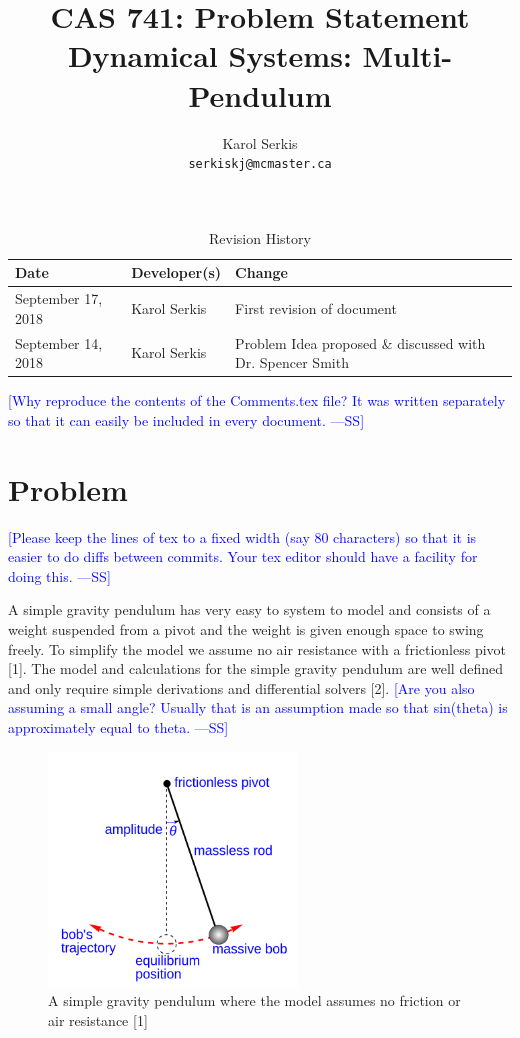 \documentclass{article}
\title{CAS 741: Problem Statement\\[10pt]\Large Dynamical Systems: Multi-Pendulum }
\author{Karol Serkis\\\texttt{serkiskj@mcmaster.ca}}
\date{}
\newcommand{\authornote}[3]{\textcolor{#1}{[#3 ---#2]}}
\newcommand{\authornote}[3]{}
\newcommand{\wss}[1]{\authornote{blue}{SS}{#1}}
\begin{document}

\maketitle

\begin{table}[hp]
\caption{Revision History} \label{TblRevisionHistory}
\begin{tabularx}{\textwidth}{llX}
\toprule
\textbf{Date} & \textbf{Developer(s)} & \textbf{Change}\\
\midrule
September 17, 2018 & Karol Serkis & First revision of document\\

September 14, 2018 & Karol Serkis & Problem Idea proposed \& discussed with Dr. Spencer Smith \\
\bottomrule
\end{tabularx}
\end{table}

\wss{Why reproduce the contents of the Comments.tex file?  It was written
  separately so that it can easily be included in every document.}

\section*{Problem}

\wss{Please keep the lines of tex to a fixed width (say 80 characters) so that
  it is easier to do diffs between commits.  Your tex editor should have a
  facility for doing this.}

A simple gravity pendulum has very easy to system to model and consists of a
weight suspended from a pivot and the weight is given enough space to swing
freely. To simplify the model we assume no air resistance with a frictionless
pivot [1]. The model and calculations for the simple gravity pendulum are well
defined and only require simple derivations and differential solvers
[2]. \wss{Are you also assuming a small angle?  Usually that is an assumption
  made so that sin(theta) is approximately equal to theta.}
\begin{figure}[H]
	\centering
	\includegraphics[width=250px]{simple-pend.png}
	\caption{A simple gravity pendulum where the model assumes no friction or air resistance [1]}
	\label{fig:maxresdefault}
\end{figure}
\end{document}
